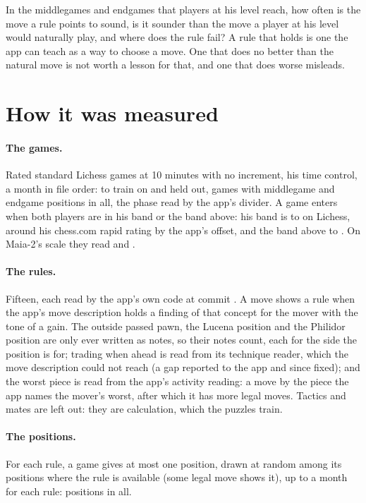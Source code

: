 \documentclass[11pt]{article}
\begin{document}
In the middlegames and endgames that players at his level reach, how often is the move a rule points
to sound, is it sounder than the move a player at his level would naturally play, and where does the
rule fail? A rule that holds is one the app can teach as a way to choose a move. One that does no
better than the natural move is not worth a lesson for that, and one that does worse misleads.

\section{How it was measured}

\paragraph{The games.} Rated standard Lichess games at 10 minutes with no increment, his time
control, \GamesMonth{} a month in file order: \TrainMonths{} to train on and \HeldMonth{} held out,
\GamesAll{} games with \PositionsAll{} middlegame and endgame positions in all, the phase read by
the app's divider. A game enters when both players are in his band or the band above: his band is
\HisLow{} to \HisHigh{} on Lichess, around his chess.com rapid rating by the app's offset, and the
band above \AboveLow{} to \AboveHigh. On Maia-2's scale they read \MaiaHis{} and \MaiaAbove.

\paragraph{The rules.} Fifteen, each read by the app's own code at commit \texttt{\AppCommit}. A
move shows a rule when the app's move description holds a finding of that concept for the mover
with the tone of a gain. The outside passed pawn, the Lucena position and the Philidor position
are only ever written as notes, so their notes count, each for the side the position is for;
trading when ahead is read from its technique reader, which the move description could not reach
(a gap reported to the app and since fixed); and the worst piece is read from the app's activity
reading: a move by the piece the app names the mover's worst, after which it has more legal moves.
Tactics and mates are left out: they are calculation, which the puzzles train.

\paragraph{The positions.} For each rule, a game gives at most one position, drawn at random among
its positions where the rule is available (some legal move shows it), up to \Cap{} a month for
each rule: \Scored{} positions in all.
\end{document}
